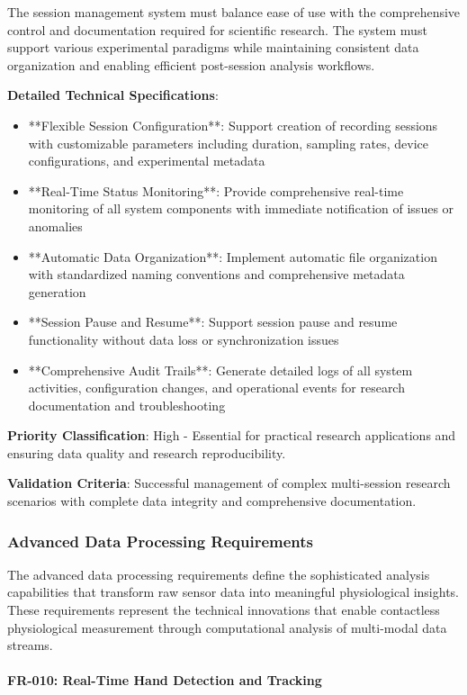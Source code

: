 \documentclass[12pt,a4paper]{report}
\begin{document}
The session management system must balance ease of use with the comprehensive control and documentation required for
scientific research. The system must support various experimental paradigms while maintaining consistent data
organization and enabling efficient post-session analysis workflows.

\textbf{Detailed Technical Specifications}:

\begin{itemize}
\item **Flexible Session Configuration**: Support creation of recording sessions with customizable parameters including
  duration, sampling rates, device configurations, and experimental metadata
\item **Real-Time Status Monitoring**: Provide comprehensive real-time monitoring of all system components with immediate
  notification of issues or anomalies
\item **Automatic Data Organization**: Implement automatic file organization with standardized naming conventions and
  comprehensive metadata generation
\item **Session Pause and Resume**: Support session pause and resume functionality without data loss or synchronization
  issues
\item **Comprehensive Audit Trails**: Generate detailed logs of all system activities, configuration changes, and
  operational events for research documentation and troubleshooting

\end{itemize}
\textbf{Priority Classification}: High - Essential for practical research applications and ensuring data quality and research
reproducibility.

\textbf{Validation Criteria}: Successful management of complex multi-session research scenarios with complete data integrity
and comprehensive documentation.

\subsubsection{Advanced Data Processing Requirements}

The advanced data processing requirements define the sophisticated analysis capabilities that transform raw sensor data
into meaningful physiological insights. These requirements represent the technical innovations that enable contactless
physiological measurement through computational analysis of multi-modal data streams.

\paragraph{FR-010: Real-Time Hand Detection and Tracking}
\end{document}
